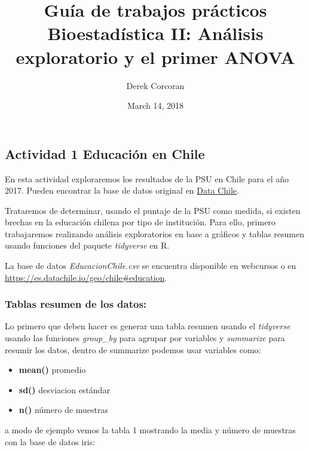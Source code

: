\documentclass[]{article}
\title{Guía de trabajos prácticos Bioestadística II: Análisis exploratorio y el
primer ANOVA}
\author{Derek Corcoran}
\date{March 14, 2018}
\newenvironment{Shaded}{\begin{snugshade}}{\end{snugshade}}
\newcommand{\KeywordTok}[1]{\textcolor[rgb]{0.13,0.29,0.53}{\textbf{#1}}}
\newcommand{\DataTypeTok}[1]{\textcolor[rgb]{0.13,0.29,0.53}{#1}}
\newcommand{\StringTok}[1]{\textcolor[rgb]{0.31,0.60,0.02}{#1}}
\newcommand{\OperatorTok}[1]{\textcolor[rgb]{0.81,0.36,0.00}{\textbf{#1}}}
\newcommand{\NormalTok}[1]{#1}
\providecommand{\tightlist}{%
  \setlength{\itemsep}{0pt}\setlength{\parskip}{0pt}}
\begin{document}
\maketitle

{
\setcounter{tocdepth}{2}
\tableofcontents
}
\subsection{Actividad 1 Educación en
Chile}\label{actividad-1-educacion-en-chile}

En esta actividad exploraremos los resultados de la PSU en Chile para el
año 2017. Pueden encontrar la base de datos original en
\href{https://es.datachile.io/geo/chile\#education}{Data Chile}.

Trataremos de determinar, usando el puntaje de la PSU como medida, si
existen brechas en la educación chilena por tipo de institución. Para
ello, primero trabajaremos realizando análisis exploratorios en base a
gráficos y tablas resumen usando funciones del paquete \emph{tidyverse}
en R.

La base de datos \emph{EducacionChile.csv} se encuentra disponible en
webcursos o en \url{https://es.datachile.io/geo/chile\#education}.

\subsubsection{Tablas resumen de los
datos:}\label{tablas-resumen-de-los-datos}

Lo primero que deben hacer es generar una tabla resumen usando el
\emph{tidyverse} usando las funciones \emph{group\_by} para agrupar por
variables y \emph{summarize} para resumir los datos, dentro de summarize
podemos usar variables como:

\begin{itemize}
\tightlist
\item
  \textbf{mean()} promedio
\item
  \textbf{sd()} desviacion estándar
\item
  \textbf{n()} número de muestras
\end{itemize}

a modo de ejemplo vemos la tabla 1 mostrando la media y número de
muestras con la base de datos iris:

\begin{Shaded}
\end{Shaded}
\end{document}
